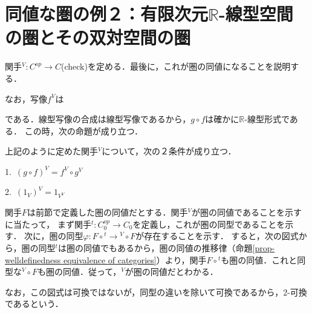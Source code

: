 \documentclass[uplatex, 12pt, dvipdfmx]{jsreport}
\begin{document}
\section{同値な圏の例２：有限次元$\mathbb{R}$-線型空間の圏とその双対空間の圏}

関手${}^V:C^{op}\to C$(check)を定める．最後に，これが圏の同値になることを説明する．
\begin{center}\end{center}
なお，写像$f^V$は
\begin{center}\end{center}
である．線型写像の合成は線型写像であるから，$g\circ f$は確かに$\mathbb{R}$-線型形式である．
この時，次の命題が成り立つ．
\begin{proposition}
    上記のように定めた関手${}^V$について，次の２条件が成り立つ．\rm{}

    1.\, $(g\circ f)^V = f^V\circ g^V$

    2.\, $(1_V)^V = 1_{V^V}$
\end{proposition}


関手$F$は前節で定義した圏の同値だとする．関手${}^V$が圏の同値であることを示すに当たって，
まず関手${}^t:C^{op}_0\to C_0$を定義し，これが圏の同型であることを示す．
次に，圏の同型$\varphi :F\circ {}^t\to {}^V\circ F$が存在することを示す．
すると，次の図式から，圏の同型${}^t$は圏の同値でもあるから，圏の同値の推移律（命題\ref{prop-welldefinedness equivalence of categories}）より，関手$F\circ {}^t$も圏の同値．これと同型な${}^V\circ F$も圏の同値．従って，${}^V$が圏の同値だとわかる．
\begin{center}\end{center}
なお，この図式は可換ではないが，同型の違いを除いて可換であるから，2-可換であるという．
\end{document}
